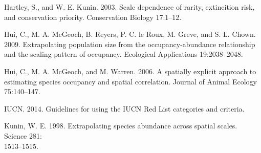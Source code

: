 \documentclass{article}[12pt, a4paper]
\begin{document}
Hartley, S., and W. E. Kunin. 2003. Scale dependence of rarity, extincition risk, and conservation priority. Conservation Biology 17:1–12.

Hui, C., M. A. McGeoch, B. Reyers, P. C. le Roux, M. Greve, and S. L. Chown. 2009. Extrapolating population size from the occupancy-abundance relationship and the scaling pattern of occupancy. Ecological Applications 19:2038–2048.

Hui, C., M. A. McGeoch, and M. Warren. 2006. A spatially explicit approach to estimating species occupancy and spatial correlation. Journal of Animal Ecology 75:140–147.

IUCN. 2014. Guidelines for using the IUCN Red List categories and criteria.

Kunin, W. E. 1998. Extrapolating species abundance across spatial scales. Science 281:\\
1513–1515.
\end{document}
